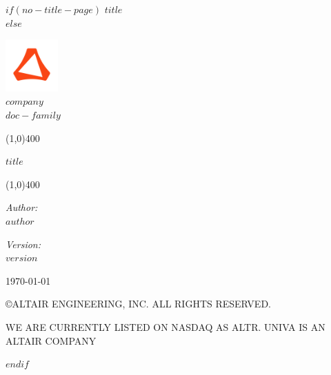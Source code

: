 \documentclass[$if(fontsize)$$fontsize$,$endif$$if(lang)$$lang$,$endif$]{$documentclass$}
\author{$for(author)$$author$$sep$ \and $endfor$}
\date{$date$}
\begin{document}
$if(no-title-page)$
{ \huge \bfseries $title$}\\[0.4cm]
$else$
\begin{titlepage}
\begin{center}

\includegraphics[width=0.15\textwidth]{./altair-360x360.png}~\\[1cm]

\textsc{\LARGE $company$}\\[1.5cm]

\textsc{\Large $doc-family$}\\[0.5cm]

\begin{center}
\noindent\line(1,0){400}
\end{center}
{ \huge \bfseries $title$}\\[0.4cm]

\begin{center}
\noindent\line(1,0){400}
\end{center}

\begin{minipage}{0.4\textwidth}
\begin{flushleft} \large
\emph{Author:}\\
$author$
\end{flushleft}
\end{minipage}
\begin{minipage}{0.4\textwidth}
\begin{flushright} \large
\emph{Version:} \\
$version$
\end{flushright}
\end{minipage}

\vfill

{\large \today}
% 
\end{center}
\vfill
\begin{center}
\copyright\thinspace\the\year\thinspace ALTAIR ENGINEERING, INC. ALL RIGHTS RESERVED.
\end{center}
\begin{center}
WE ARE CURRENTLY LISTED ON NASDAQ AS ALTR. UNIVA IS AN ALTAIR COMPANY
\end{center}

\vspace*{2\baselineskip}
\cleardoublepage
\rfoot{\thepage}
\end{titlepage}
$endif$
\end{document}
